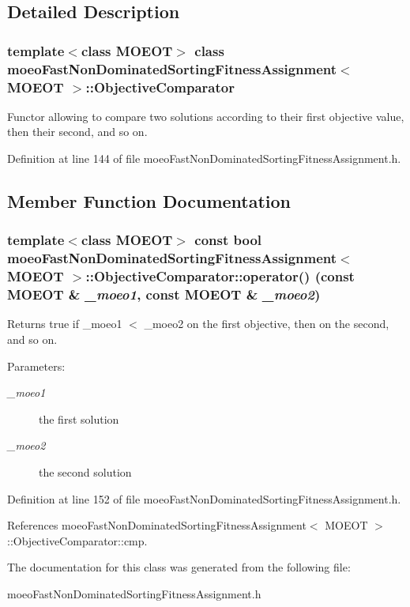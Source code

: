 \subsection{Detailed Description}
\subsubsection*{template$<$class MOEOT$>$ class moeo\-Fast\-Non\-Dominated\-Sorting\-Fitness\-Assignment$<$ MOEOT $>$::Objective\-Comparator}

Functor allowing to compare two solutions according to their first objective value, then their second, and so on. 



Definition at line 144 of file moeo\-Fast\-Non\-Dominated\-Sorting\-Fitness\-Assignment.h.

\subsection{Member Function Documentation}
\subsubsection{\setlength{\rightskip}{0pt plus 5cm}template$<$class MOEOT$>$ const bool \bf{moeo\-Fast\-Non\-Dominated\-Sorting\-Fitness\-Assignment}$<$ MOEOT $>$::Objective\-Comparator::operator() (const MOEOT \& {\em \_\-moeo1}, const MOEOT \& {\em \_\-moeo2})\hspace{0.3cm}{\tt  [inline]}}\label{classmoeoFastNonDominatedSortingFitnessAssignment_1_1ObjectiveComparator_21ba1645a166a348a24c204e88f97987}


Returns true if \_\-moeo1 $<$ \_\-moeo2 on the first objective, then on the second, and so on. 

\begin{Desc}
\item[Parameters:]
\begin{description}
\item[{\em \_\-moeo1}]the first solution \item[{\em \_\-moeo2}]the second solution \end{description}
\end{Desc}


Definition at line 152 of file moeo\-Fast\-Non\-Dominated\-Sorting\-Fitness\-Assignment.h.

References moeo\-Fast\-Non\-Dominated\-Sorting\-Fitness\-Assignment$<$ MOEOT $>$::Objective\-Comparator::cmp.

The documentation for this class was generated from the following file:\begin{CompactItemize}
\item 
moeo\-Fast\-Non\-Dominated\-Sorting\-Fitness\-Assignment.h\end{CompactItemize}
